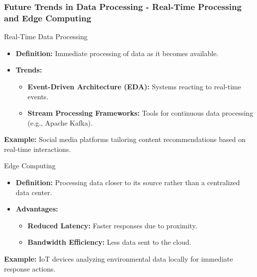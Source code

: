 \documentclass[aspectratio=169]{beamer}
\begin{document}
\begin{frame}[fragile]
    \frametitle{Future Trends in Data Processing - Real-Time Processing and Edge Computing}
    \begin{block}{Real-Time Data Processing}
        \begin{itemize}
            \item \textbf{Definition:} Immediate processing of data as it becomes available.
            \item \textbf{Trends:}
                \begin{itemize}
                    \item \textbf{Event-Driven Architecture (EDA):} Systems reacting to real-time events.
                    \item \textbf{Stream Processing Frameworks:} Tools for continuous data processing (e.g., Apache Kafka).
                \end{itemize}
        \end{itemize}
        \textbf{Example:} Social media platforms tailoring content recommendations based on real-time interactions.
    \end{block}
    
    \begin{block}{Edge Computing}
        \begin{itemize}
            \item \textbf{Definition:} Processing data closer to its source rather than a centralized data center.
            \item \textbf{Advantages:}
                \begin{itemize}
                    \item \textbf{Reduced Latency:} Faster responses due to proximity.
                    \item \textbf{Bandwidth Efficiency:} Less data sent to the cloud.
                \end{itemize}
        \end{itemize}
        \textbf{Example:} IoT devices analyzing environmental data locally for immediate response actions.
    \end{block}
\end{frame}
\end{document}
